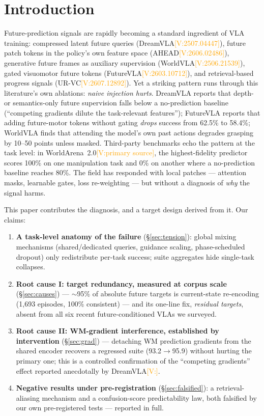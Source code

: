 \documentclass[conference]{IEEEtran}
\newcommand{\verify}[1]{\textcolor{orange}{[V:#1]}}
\begin{document}
\section{Introduction}
Future-prediction signals are rapidly becoming a standard ingredient of
VLA training: compressed latent future queries (DreamVLA\verify{2507.04447}),
future patch tokens in the policy's own feature space
(AHEAD\verify{2606.02486}), generative future frames as auxiliary
supervision (WorldVLA\verify{2506.21539}), gated visuomotor future tokens
(FutureVLA\verify{2603.10712}), and retrieval-based progress signals
(UR-VC\verify{2607.12892}). Yet a striking pattern runs through this
literature's own ablations: \emph{naive injection hurts}. DreamVLA
reports that depth- or semantics-only future supervision falls below a
no-prediction baseline (``competing gradients dilute the task-relevant
features''); FutureVLA reports that adding future-motor tokens without
gating \emph{drops} success from 62.5\% to 58.4\%; WorldVLA finds that
attending the model's own past actions degrades grasping by 10--50
points unless masked. Third-party benchmarks echo the pattern at the
task level: in WorldArena~2.0\verify{primary source}, the
highest-fidelity predictor scores 100\% on one manipulation task and
0\% on another where a no-prediction baseline reaches 80\%. The field
has responded with local patches --- attention masks, learnable gates,
loss re-weighting --- but without a diagnosis of \emph{why} the signal
harms.

This paper contributes the diagnosis, and a target design derived from
it. Our claims:

\begin{enumerate}
\item \textbf{A task-level anatomy of the failure} (\S\ref{sec:tension}):
global mixing mechanisms (shared/dedicated queries, guidance scaling,
phase-scheduled dropout) only redistribute per-task success; suite
aggregates hide single-task collapses.
\item \textbf{Root cause I: target redundancy, measured at corpus scale}
(\S\ref{sec:causes}) --- $\sim$95\% of absolute future targets is
current-state re-encoding (1{,}693 episodes, 100\% consistent) --- and
its one-line fix, \emph{residual targets}, absent from all six recent
future-conditioned VLAs we surveyed.
\item \textbf{Root cause II: WM-gradient interference, established by
intervention} (\S\ref{sec:grad}) --- detaching WM prediction gradients
from the shared encoder recovers a regressed suite (93.2$\to$95.9)
without hurting the primary one; this is a controlled confirmation of
the ``competing gradients'' effect reported anecdotally by
DreamVLA\verify{}.
\item \textbf{Negative results under pre-registration}
(\S\ref{sec:falsified}): a retrieval-aliasing mechanism and a
confusion-score predictability law, both falsified by our own
pre-registered tests --- reported in full.
\end{enumerate}
\end{document}
